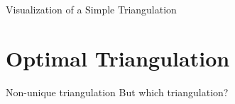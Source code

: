 \documentclass[10pt]{beamer}
\begin{document}
\begin{frame}{Visualization of a Simple Triangulation}
\end{frame}

\section{Optimal Triangulation}

\begin{frame}{Non-unique triangulation}
	But which triangulation?
	\begin{figure}[h]
		\begin{minipage}[h]{0.49\linewidth}
		\end{minipage}
		\hfill
		\begin{minipage}[h]{0.49\linewidth}

\end{minipage}
\end{figure}
\end{frame}
\end{document}

